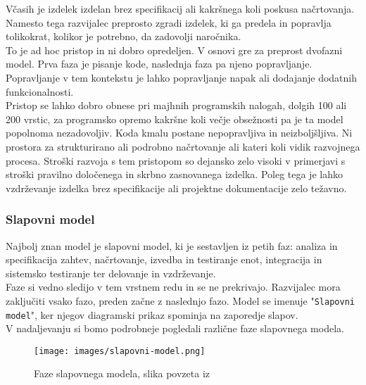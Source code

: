 \documentclass[a4paper,12pt,openright]{book}
\begin{document}
Včasih je izdelek izdelan brez specifikacij ali kakršnega koli poskusa načrtovanja. Namesto tega razvijalec preprosto zgradi izdelek, ki ga predela in popravlja tolikokrat, kolikor je potrebno, da zadovolji naročnika. \\
To je ad hoc pristop in ni dobro opredeljen. V osnovi gre za preprost dvofazni model. Prva faza je pisanje kode, naslednja faza pa njeno popravljanje. Popravljanje v tem kontekstu je lahko popravljanje napak ali dodajanje dodatnih funkcionalnosti. \\
Pristop se lahko dobro obnese pri majhnih programskih nalogah, dolgih 100 ali 200 vrstic, za programsko opremo kakršne koli večje obsežnosti pa je ta model popolnoma nezadovoljiv. Koda kmalu postane nepopravljiva in neizboljšljiva. Ni prostora za strukturirano ali podrobno načrtovanje ali kateri koli vidik razvojnega procesa. Stroški razvoja s tem pristopom so dejansko zelo visoki v primerjavi s stroški pravilno določenega in skrbno zasnovanega izdelka. Poleg tega je lahko vzdrževanje izdelka brez specifikacije ali projektne dokumentacije zelo težavno. \cite{schach1996classical}
\subsubsection{Slapovni model}
Najbolj znan model je slapovni model, ki je sestavljen iz petih faz: analiza in specifikacija zahtev, načrtovanje, izvedba in testiranje enot, integracija in sistemsko testiranje ter delovanje in vzdrževanje. \\
Faze si vedno sledijo v tem vrstnem redu in se ne prekrivajo. Razvijalec mora zaključiti vsako fazo, preden začne z naslednjo fazo. Model se imenuje "\texttt{Slapovni model}", ker njegov diagramski prikaz spominja na zaporedje slapov. \cite{aggarwal2005software} \\
V nadaljevanju si bomo podrobneje pogledali različne faze slapovnega modela.

\begin{figure}[H]
    \centering
    \texttt{[image: images/slapovni-model.png]}
    \caption{Faze slapovnega modela, slika povzeta iz \cite{mercun2012}}
    \label{fig:enter-label}
\end{figure}
\end{document}

